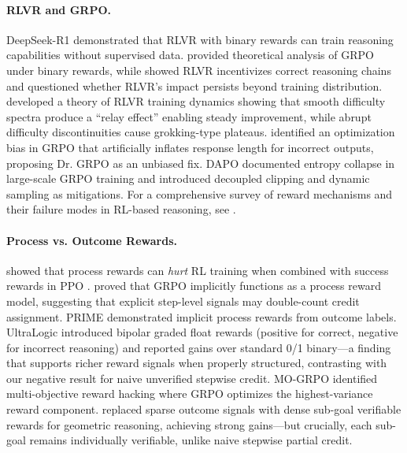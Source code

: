 \documentclass[11pt]{article}
\begin{document}
\paragraph{RLVR and GRPO.}
DeepSeek-R1 \citep{deepseek2025r1} demonstrated that RLVR with binary rewards can train reasoning capabilities without supervised data.
\citet{mroueh2025grpo} provided theoretical analysis of GRPO under binary rewards, while \citet{wen2025rlvr} showed RLVR incentivizes correct reasoning chains and \citet{yue2025rlvr} questioned whether RLVR's impact persists beyond training distribution.
\citet{huang2026dynamics} developed a theory of RLVR training dynamics showing that smooth difficulty spectra produce a ``relay effect'' enabling steady improvement, while abrupt difficulty discontinuities cause grokking-type plateaus.
\citet{liu2025drgrpo} identified an optimization bias in GRPO that artificially inflates response length for incorrect outputs, proposing Dr. GRPO as an unbiased fix.
DAPO \citep{yu2025dapo} documented entropy collapse in large-scale GRPO training and introduced decoupled clipping and dynamic sampling as mitigations.
For a comprehensive survey of reward mechanisms and their failure modes in RL-based reasoning, see \citet{pan2026survey}.

\paragraph{Process vs. Outcome Rewards.}
\citet{gao2024designing} showed that process rewards can \emph{hurt} RL training when combined with success rewards in PPO \citep{schulman2017ppo}.
\citet{sullivan2025grpoprm} proved that GRPO implicitly functions as a process reward model, suggesting that explicit step-level signals may double-count credit assignment.
PRIME \citep{cui2025prime} demonstrated implicit process rewards from outcome labels. UltraLogic \citep{ultralogic2025} introduced bipolar graded float rewards (positive for correct, negative for incorrect reasoning) and reported gains over standard 0/1 binary---a finding that supports richer reward signals when properly structured, contrasting with our negative result for naive unverified stepwise credit.
MO-GRPO \citep{mogrpo2025} identified multi-objective reward hacking where GRPO optimizes the highest-variance reward component.
\citet{chen2026milestones} replaced sparse outcome signals with dense sub-goal verifiable rewards for geometric reasoning, achieving strong gains---but crucially, each sub-goal remains individually verifiable, unlike naive stepwise partial credit.
\end{document}
